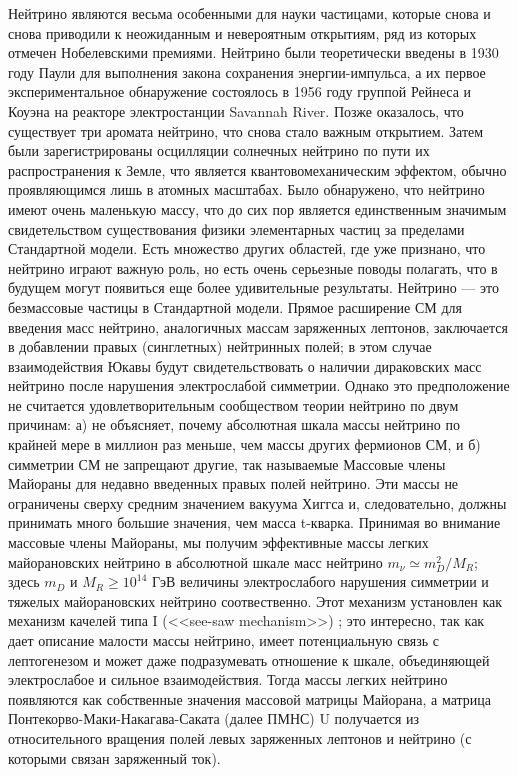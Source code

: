 \documentclass[a4paper,14pt]{extarticle}
\begin{document}
    Нейтрино являются весьма особенными для науки частицами, которые снова и снова 
    приводили к неожиданным и невероятным открытиям, ряд из которых отмечен Нобелевскими 
    премиями. Нейтрино были теоретически введены в 1930 году Паули для выполнения закона сохранения 
    энергии-импульса, а их первое экспериментальное обнаружение состоялось в 1956 году 
    группой Рейнеса и Коуэна на реакторе электростанции Savannah River. Позже оказалось, что существует три аромата нейтрино,
    что снова стало важным открытием. Затем были зарегистрированы осцилляции солнечных 
    нейтрино по пути их распространения к Земле, что является квантовомеханическим эффектом,
    обычно проявляющимся лишь в атомных масштабах. Было обнаружено, что нейтрино имеют 
    очень маленькую массу, что до сих пор является единственным значимым свидетельством
    существования физики элементарных частиц за пределами Стандартной модели. Есть множество других областей, где уже признано, 
    что нейтрино играют важную роль, но есть очень серьезные поводы полагать, что в будущем 
    могут появиться еще более удивительные результаты. Нейтрино — это безмассовые частицы в 
    Стандартной модели. Прямое расширение СМ для введения масс нейтрино, аналогичных массам 
    заряженных лептонов, заключается в добавлении правых (синглетных) нейтринных полей; в этом 
    случае  взаимодействия Юкавы будут свидетельствовать о наличии дираковских масс нейтрино 
    после нарушения электрослабой симметрии. Однако это предположение не считается удовлетворительным 
    сообществом теории нейтрино по двум причинам: а) не объясняет, почему абсолютная шкала 
    массы нейтрино по крайней мере в миллион раз меньше, чем массы других фермионов СМ, и 
    б) симметрии СМ не запрещают другие, так называемые Массовые члены Майораны для недавно 
    введенных правых полей нейтрино. Эти массы не ограничены сверху средним значением вакуума 
    Хиггса и, следовательно, должны принимать много большие значения, чем масса t-кварка. 
    Принимая во внимание массовые члены Майораны, мы получим эффективные массы легких майорановских 
    нейтрино в абсолютной шкале масс нейтрино $m_{\nu} \simeq m^2_D/M_R$; здесь $m_{D}$ и $M_R \geq 10^{14}$ ГэВ 
    величины электрослабого нарушения симметрии и тяжелых майорановских нейтрино соотвественно. 
    Этот механизм установлен как механизм качелей типа I (<<see-saw mechanism>>) \cite{minkowski} 
    \cite{https://doi.org/10.48550/arxiv.1306.4669}; это интересно, так как дает описание 
    малости массы нейтрино, имеет потенциальную связь с лептогенезом и может даже подразумевать 
    отношение к шкале, объединяющей электрослабое и сильное взаимодействия. Тогда массы легких 
    нейтрино появляются как собственные значения массовой матрицы Майорана, а матрица 
    Понтекорво-Маки-Накагава-Саката (далее ПМНС) U получается из относительного вращения полей 
    левых заряженных лептонов и нейтрино (с которыми связан заряженный ток).
    
\end{document}
